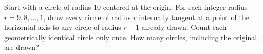 Start with a circle of radius $10$ centered at the origin. For each integer radius $r=9,8,\ldots,1$, draw every circle of radius $r$ internally tangent at a point of the horizontal axis to any circle of radius $r+1$ already drawn. Count each geometrically identical circle only once. How many circles, including the original, are drawn?
